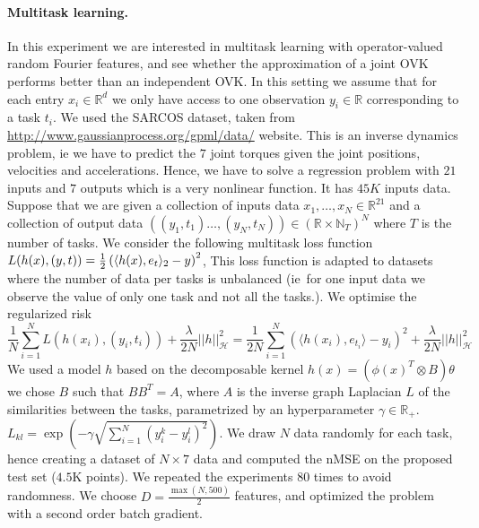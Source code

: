 \documentclass[twoside,11pt]{article}
\begin{document}
\paragraph{Multitask learning.}
In this experiment we are interested in multitask learning with operator-valued
random Fourier features, and see whether the approximation of a joint \acs{OVK}
performs better than an independent \acs{OVK}. In this setting we assume that
for each entry $x_i\in\mathbb{R}^d$ we only have access to one observation
$y_i\in\mathbb{R}$ corresponding to a task $t_i$.  We used the SARCOS dataset,
taken from \url{http://www.gaussianprocess.org/gpml/data/} website. This is an
inverse dynamics problem, \acs{ie} we have to predict the $7$ joint torques
given the joint positions, velocities and accelerations.  Hence, we have to
solve a regression problem with $21$ inputs and $7$ outputs which is a very
nonlinear function. It has $45K$ inputs data.  Suppose that we are given a
collection of inputs data $x_1, \hdots, x_N\in\mathbb{R}^{21}$ and a collection
of output data $((y_1, t_1) \hdots, (y_N, t_N)) \in \left(\mathbb{R}\times
\mathbb{N}_T\right)^N$ where $T$ is the number of tasks.  We consider the
following multitask loss function $L(h(x), (y,t))=\frac{1}{2}\left(\langle h(x),
e_t\rangle_2-y\right)^2$, This loss function is adapted to datasets where the number
of data per tasks is unbalanced (\acs{ie}~for one input data we observe the
value of only one task and not all the tasks.). We optimise the regularized
risk
\begin{dmath*}
    \frac{1}{N}\sum_{i=1}^N  L\left(h(x_i), (y_i, t_i)\right) +
    \frac{\lambda}{2N}||{h}||_{\mathcal{H}}^2=\frac{1}{2N}\sum_{i=1}^N
    \left(\langle h(x_i), e_{t_i} \rangle-y_i\right)^2 +
    \frac{\lambda}{2N}||{h}||_{\mathcal{H}}^2
\end{dmath*}
We used a model $h$ based on the decomposable kernel $h(x)= (\phi(x)^T \otimes
B) \theta$ we chose $B$ such that $BB^T=A$, where $A$ is the inverse graph
Laplacian $L$ of the similarities between the tasks, parametrized by an
hyperparameter $\gamma \in \mathbb{R}_+$.
$L_{kl}=\exp\left(-\gamma\sqrt{\sum_{i=1}^N \left(y_i^k -
y_i^l\right)^2}\right)$.  We draw $N$ data randomly for each task, hence
creating a dataset of $N\times 7$ data and computed the nMSE on the proposed
test set ($4.5$K points). We repeated the experiments $80$ times to avoid
randomness. We choose $D=\frac{\max(N, 500)}{2}$ features, and optimized the
problem with a second order batch gradient.
\end{document}
